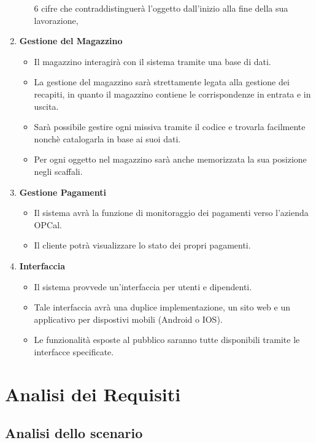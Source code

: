 \begin{enumerate}
\begin{itemize}
        6 cifre che contraddistinguerà l'oggetto dall'inizio alla fine della sua lavorazione,
    \end{itemize}
  \item \textbf{Gestione del Magazzino} \begin{itemize}
      \item Il magazzino interagirà con il sistema tramite una base di dati.
      \item La gestione del magazzino sarà strettamente legata alla gestione dei recapiti, in quanto il magazzino contiene 
        le corrispondenze in entrata e in uscita.
      \item Sarà possibile gestire ogni missiva tramite il codice e trovarla facilmente nonchè catalogarla in base ai suoi dati.
      \item Per ogni oggetto nel magazzino sarà anche memorizzata la sua posizione negli scaffali.
    \end{itemize}
  \item \textbf{Gestione Pagamenti} \begin{itemize}
      \item Il sistema avrà la funzione di monitoraggio dei pagamenti verso l'azienda OPCal.
      \item Il cliente potrà visualizzare lo stato dei propri pagamenti.
    \end{itemize}
  \item \textbf{Interfaccia} \begin{itemize}
      \item Il sistema provvede un'interfaccia per utenti e dipendenti.
      \item Tale interfaccia avrà una duplice implementazione, un sito web e un applicativo per dispostivi mobili (Android o IOS).
      \item Le funzionalità esposte al pubblico saranno tutte disponibili tramite le interfacce specificate.
    \end{itemize}
\end{enumerate}

\newpage
\section{Analisi dei Requisiti}
\subsection{Analisi dello scenario}

